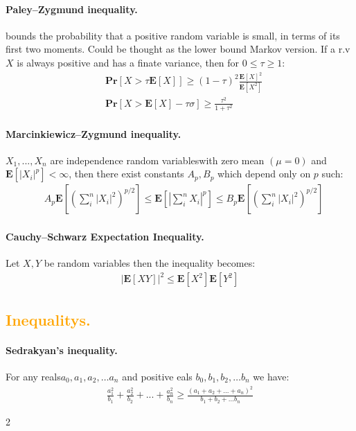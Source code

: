 \documentclass{article}
\newcommand{\prb}[1]{ \mathbf{Pr} \left[ {#1} \right]}
\newcommand{\expp}[1]{ \mathbf{E} \left[ {#1} \right]}
\newcommand{\indpr}{$ X_1, ..., X_n$ are independence random variables}
\begin{document}
\begin{multicols*}{2}
    \paragraph{Paley–Zygmund inequality.} bounds the probability that a positive random variable is small, in terms of its first two moments. Could be thought as the lower bound Markov version. If a r.v $X$ is always positive and has a finate variance, then for $0 \le \tau \ge 1$:  
    \begin{equation*}
      \begin{split}
	& \prb{ X > \tau \expp{X} } \ge \left( 1 - \tau \right)^{2}\frac{\expp{X}^{2}}{\expp{X^2}}\\
	&  \prb{ X > \expp{X} - \tau \sigma } \ge \frac{\tau^{2}}{1+\tau^{2}} 
      \end{split}
    \end{equation*}
    \paragraph{Marcinkiewicz–Zygmund inequality.} \indpr with zero mean $\left( \mu = 0  \right)$ and $\expp{|X_{i}|^{p}} < \infty$, then there exist constants $A_{p}, B_{p}$ which depend only on $p$ such:  
    \begin{equation*}
      \begin{split}
	& A_{p}\expp{\left( \sum_{i}^{n}{|X_{i}|^{2}} \right)^{p/2}  } \le \expp{|\sum_{i}^{n}{X_{i}}|^{p} }\le B_{p}\expp{\left( \sum_{i}^{n}{|X_{i}|^{2}} \right)^{p/2}  }        
      \end{split}
    \end{equation*}
    \paragraph{Cauchy–Schwarz Expectation Inequality.} Let $X,Y$ be random variables then the inequality becomes: 
    \begin{equation*}
      \begin{split}
	|\expp{ XY} |^{2}\le\expp{X^{2}}\expp{Y^{2}}
      \end{split}
    \end{equation*}
    \subsection*{{\textcolor{orange}{Inequalitys.}} } 
    \paragraph{Sedrakyan's inequality.} For any reals$a_{0},a_{1},a_{2},\ldots a_{n}$ and positive eals $b_{0},b_{1},b_{2},\ldots b_{n}$ we have:  
    \begin{equation*}
      \begin{split}
	\frac{a_{1}^2}{b_{1}}+\frac{a_{2}^2}{b_{2}}+ ...+ \frac{a_{n}^2}{b_{n}} \ge \frac{\left( a_{1}+ a_{2} + ... + a_{n}  \right)^{2}}{b_{1}+b_{2}+... b_{n}}  
      \end{split}
    \end{equation*}
  \end{multicols*}{2}
  
\end{document}
